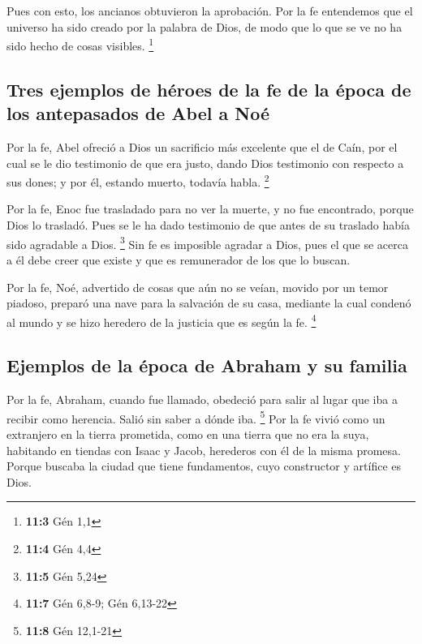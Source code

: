  Pues con esto, los ancianos obtuvieron la aprobación.
 Por la fe entendemos que el universo ha sido creado por
la palabra de Dios, de modo que lo que se ve no ha sido hecho de cosas
visibles. \footnote{\textbf{11:3} Gén 1,1}

\hypertarget{tres-ejemplos-de-huxe9roes-de-la-fe-de-la-uxe9poca-de-los-antepasados-de-abel-a-nouxe9}{%
\subsection{Tres ejemplos de héroes de la fe de la época de los
antepasados \hspace{0pt}\hspace{0pt}de Abel a
Noé}\label{tres-ejemplos-de-huxe9roes-de-la-fe-de-la-uxe9poca-de-los-antepasados-de-abel-a-nouxe9}}

 Por la fe, Abel ofreció a Dios un sacrificio más
excelente que el de Caín, por el cual se le dio testimonio de que era
justo, dando Dios testimonio con respecto a sus dones; y por él, estando
muerto, todavía habla. \footnote{\textbf{11:4} Gén 4,4}

 Por la fe, Enoc fue trasladado para no ver la muerte, y
no fue encontrado, porque Dios lo trasladó. Pues se le ha dado
testimonio de que antes de su traslado había sido agradable a Dios.
\footnote{\textbf{11:5} Gén 5,24}  Sin fe es imposible
agradar a Dios, pues el que se acerca a él debe creer que existe y que
es remunerador de los que lo buscan.

 Por la fe, Noé, advertido de cosas que aún no se veían,
movido por un temor piadoso, preparó una nave para la salvación de su
casa, mediante la cual condenó al mundo y se hizo heredero de la
justicia que es según la fe. \footnote{\textbf{11:7} Gén 6,8-9; Gén
  6,13-22}

\hypertarget{ejemplos-de-la-uxe9poca-de-abraham-y-su-familia}{%
\subsection{Ejemplos de la época de Abraham y su
familia}\label{ejemplos-de-la-uxe9poca-de-abraham-y-su-familia}}

 Por la fe, Abraham, cuando fue llamado, obedeció para
salir al lugar que iba a recibir como herencia. Salió sin saber a dónde
iba. \footnote{\textbf{11:8} Gén 12,1-21}  Por la fe vivió
como un extranjero en la tierra prometida, como en una tierra que no era
la suya, habitando en tiendas con Isaac y Jacob, herederos con él de la
misma promesa.  Porque buscaba la ciudad que tiene
fundamentos, cuyo constructor y artífice es Dios.

